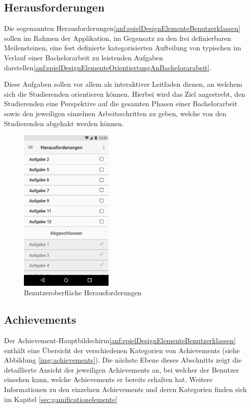 \documentclass[bibliography=totoc,listof=totoc,BCOR=5mm,DIV=12,oneside]{scrbook}
\begin{document}
\newpage
\subsection{Herausforderungen}
\par Die sogenannten Herausforderungen\ref{anf:spielDesignElementeBenutzerklassen} sollen im Rahmen der Applikation, im Gegensatz zu den frei definierbaren Meilensteinen, eine fest definierte kategorisierten Aufteilung von typischen im Verlauf einer Bachelorarbeit zu leistenden Aufgaben darstellen\ref{anf:spielDesignElementeOrientiertungAnBachelorarabeit}. 
\par Diese Aufgaben sollen vor allem als interaktiver Leitfaden dienen, an welchem sich die Studierenden orientieren können. Hierbei wird das Ziel angestrebt, den Studierenden eine Perspektive auf die gesamten Phasen einer Bachelorarbeit sowie den jeweiligen einzelnen Arbeitsschritten zu geben, welche von den Studierenden abgehakt werden können. 

\begin{figure}[H]
	\centering
	\includegraphics[width=0.4\textwidth, keepaspectratio]{Bilder/Prototyp/AufgabenSortiert.jpg}
	\caption{Benutzeroberfläche Herausforderungen}
	\label{img:aufgaben}
\end{figure}

\newpage
\subsection{Achievements}
\par Der Achievement-Hauptbildschirm\ref{anf:spielDesignElementeBenutzerklassen} enthält eine Übersicht der verschiedenen Kategorien von Achievements (siehe Abbildung \ref{img:achievements}). Die nächste Ebene dieses Abschnitts zeigt die detaillierte Ansicht der jeweiligen Achievements an, bei welcher der Benutzer einsehen kann, welche Achievements er bereits erhalten hat. Weitere Informationen zu den einzelnen Achievements und deren Kategorien finden sich im Kapitel \ref{sec:gamificationelemente}\\
\end{document}
